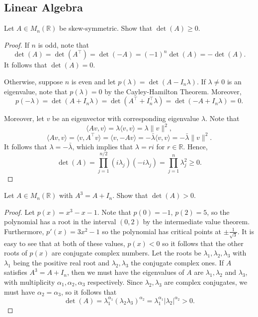 \documentclass[11pt]{article}
\newcommand{\R}{\mathbb{R}}
\renewcommand{\>}{\rangle}
\newcommand{\<}{\langle}
\begin{document}
\subsection{Linear Algebra}
\begin{problem} Let $A \in M_n(\R)$ be skew-symmetric. Show that $\det(A) \ge 0$.
\end{problem}
\begin{proof}
If $n$ is odd, note that
 $$\det(A) = \det(A^\intercal) = \det(-A) = (-1)^n \det(A) = -\det(A).$$
 It follows that $\det(A) = 0$.

Otherwise, suppose $n$ is even and let $p(\lambda) = \det(A - I_n \lambda)$.  If $\lambda \ne 0$ is an eigenvalue, note that $p(\lambda) = 0$ by the Cayley-Hamilton Theorem.  Moreover,
$$p(-\lambda) = \det(A + I_n \lambda) = \det(A^\intercal + I_n^\intercal \lambda) = \det(-A + I_n \lambda) = 0.$$

Moreover, let $v$ be an eigenvector with corresponding eigenvalue $\lambda$.   Note that 
$$\<Av, v\> = \lambda\<v, v\> = \lambda \|v\|^2,$$
$$\<Av, v\> = \<v, A^\intercal v\> = \<v, -Av\> = -\bar{\lambda} \<v, v\> = -\bar{\lambda} \|v\|^2.$$
It follows that $\lambda = -\bar{\lambda}$, which implies that $\lambda = r i$ for $r \in \R$.  Hence,
$$\det(A) = \prod_{j=1}^{n/2} (i \lambda_j)(-i \lambda_j) = \prod_{j=1}^n \lambda_j^2 \ge 0.$$ 
\end{proof}

\begin{problem} Let $A \in M_n(\R)$ with $A^3 = A + I_n$.  Show that $\det(A) > 0$.
\end{problem}
\begin{proof}
Let $p(x) = x^3 - x - 1$.  Note that $p(0) = -1$, $p(2) = 5$, so the polynomial has a root in the interval $(0, 2)$ by the intermediate value theorem.  Furthermore, $p'(x) = 3x^2 - 1$ so the polynomial has critical points at $\pm\frac{1}{\sqrt{3}}$.  It is easy to see that at both of these values, $p(x) < 0$ so it follows that the other roots of $p(x)$ are conjugate complex numbers.  Let the roots be $\lambda_1, \lambda_2, \lambda_3$ with $\lambda_1$ being the positive real root and $\lambda_2, \lambda_3$ the conjugate complex ones.  If $A$ satisfies $A^3 = A + I_n$, then we must have the eigenvalues of $A$ are $\lambda_1, \lambda_2$ and $\lambda_3$, with multiplicity $\alpha_1, \alpha_2, \alpha_3$ respectively.  Since $\lambda_2, \lambda_3$ are complex conjugates, we must have $\alpha_2 = \alpha_3$, so it follows that 
$$\det(A) = \lambda_1^{\alpha_1} (\lambda_2 \lambda_3)^{\alpha_2} = \lambda_1^{\alpha_1} |\lambda_2|^{\alpha_2} > 0.$$
\end{proof}
\end{document}
